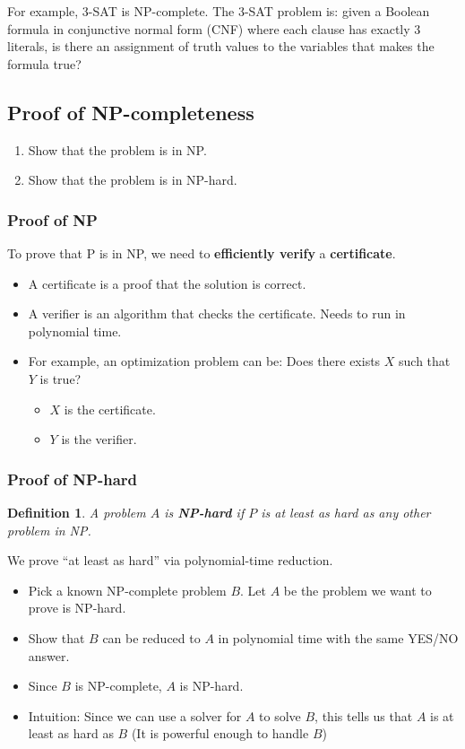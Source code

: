 \documentclass[11pt,fleqn]{article}
\newtheorem*{definition}{Definition}
\begin{document}
For example, 3-SAT is NP-complete. The 3-SAT problem is: given a Boolean formula in conjunctive normal form (CNF) where each clause has exactly 3 literals, is there an assignment of truth values to the variables that makes the formula true?

\subsection{Proof of NP-completeness}
\begin{enumerate}
    \item Show that the problem is in NP.
    \item Show that the problem is in NP-hard.
\end{enumerate}
\subsubsection{Proof of NP}
To prove that P is in NP, we need to \textbf{efficiently verify} a \textbf{certificate}.\begin{itemize}
    \item A certificate is a proof that the solution is correct.
    \item A verifier is an algorithm that checks the certificate. Needs to run in polynomial time.
    \item For example, an optimization problem can be: Does there exists $X$ such that $Y$ is true?\begin{itemize}
        \item $X$ is the certificate.
        \item $Y$ is the verifier.
    \end{itemize}
\end{itemize}
\subsubsection{Proof of NP-hard}
\begin{definition}
    A problem $A$ is \textbf{NP-hard} if $P$ is at least as hard as any other problem in NP.
\end{definition}
We prove ``at least as hard'' via polynomial-time reduction. 
\begin{itemize}
    \item Pick a known NP-complete problem $B$. Let $A$ be the problem we want to prove is NP-hard.
    \item Show that $B$ can be reduced to $A$ in polynomial time with the same YES/NO answer.
    \item Since $B$ is NP-complete, $A$ is NP-hard.
    \item Intuition: Since we can use a solver for $A$ to solve $B$, this tells us that $A$ is at least as hard as $B$ (It is powerful enough to handle $B$)
\end{itemize}
\end{document}
